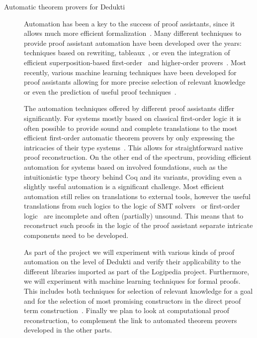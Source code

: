 \begin{description}
\item[Automatic theorem provers for Dedukti]

  Automation has been a key to the success of proof assistants, since it
  allows much more efficient formalization~\cite{Hales-Developments}.
  Many different techniques to provide proof assistant automation have
  been developed over the years: techniques based on rewriting,
  tableaux~\cite{Paulson-blast}, or even the integration of efficient
  superposition-based first-order~\cite{hurd-metis} and higher-order
  provers~\cite{asperti-matita-paramodulation}. Most recently, various
  machine learning techniques have been developed for proof assistants
  allowing for more precise selection of relevant
  knowledge~\cite{blanchette-h4qed-jfr} or even the prediction of useful
  proof techniques~\cite{gauthier-tactictoe}.

  The automation techniques offered by different proof assistants
  differ significantly. For systems mostly based on classical
  first-order logic it is often possible to provide sound and complete
  translations to the most efficient first-order automatic theorem
  provers by only expressing the intricacies of their type
  systems~\cite{kaliszyk-miz40}. This allows for straightforward
  native proof reconstruction. On the other end of the spectrum,
  providing efficient automation for systems based on involved
  foundations, such as the intuitionistic type theory behind Coq and
  its variants, providing even a slightly useful automation is a
  significant challenge. Most efficient automation still relies on
  translations to external tools, however the useful translations from
  such logics to the logic of SMT
  solvers~\cite{DBLP:conf/cpp/ArmandFGKTW11} or first-order
  logic~\cite{DBLP:journals/jar/CzajkaK18} are incomplete and often
  (partially) unsound. This means that to reconstruct such proofs in
  the logic of the proof assistant separate intricate components need
  to be developed.

  As part of the project we will experiment with various kinds of proof
  automation on the level of Dedukti and verify their applicability to
  the different libraries imported as part of the Logipedia project.
  Furthermore, we will experiment with machine learning techniques for
  formal proofs. This includes both techniques for selection of relevant
  knowledge for a goal and for the selection of most promising
  constructors in the direct proof term
  construction~\cite{ZielenkiewiczSchubert2016}. Finally we plan to look
  at computational proof reconstruction, to complement the link to
  automated theorem provers developed in the other parts.


\end{description}
